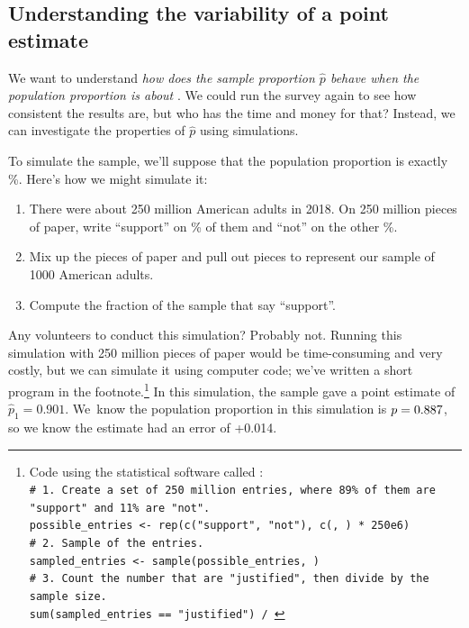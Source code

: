 \subsection{Understanding the variability of a point estimate}
\label{simulationForUnderstandingVariabilitySection}

We want to understand \emph{how does the
sample proportion $\hat{p}$ behave when the population
proportion is about \pewsolarpollprop{}}. We could
run the survey again to see how consistent the results
are, but who has the time and money for that? Instead,
we can investigate the properties of $\hat{p}$ using simulations.

To simulate the sample, we'll suppose that the population
proportion is exactly \pewsolarpollpercent{}\%.
Here's how we might simulate it:
\begin{enumerate}
\item There were about 250 million American adults in 2018.
    On 250 million pieces of paper, write ``support''
    on \pewsolarpollpercent{}\% of them and ``not'' on
    the other \pewsolarpollpercentcomplement{}\%.
\item Mix up the pieces of paper and pull out \pewsolarpollsize{}
    pieces to represent our sample of 1000 American adults.
\item Compute the fraction of the sample that say ``support''.
\end{enumerate}
Any volunteers to conduct this simulation? Probably not. Running
this simulation with 250 million pieces of paper would be
time-consuming and very costly, but we can simulate it
using computer code; we've written a short program in the
footnote.\footnote{Code using the statistical software called \R: \\
\texttt{\# 1. Create a set of 250 million entries,
where 89\% of them are "support" and 11\% are "not". \\
possible\_entries <- rep(c("support", "not"),
    c(\pewsolarpollprop{}, \pewsolarpollpropcomplement{}) * 250e6)\\
\# 2. Sample \pewsolarpollsize{} of the entries. \\
sampled\_entries <- sample(possible\_entries, \pewsolarpollsize{}) \\
\# 3. Count the number that are "justified", then divide
by the sample size. \\
sum(sampled\_entries == "justified") / \pewsolarpollsize{}}}
In this simulation, the sample gave a point estimate of
$\hat{p}_1 = 0.901$. We~know the population proportion
in this simulation is $p = 0.887{}$, so we know
the estimate had an error of +0.014.

